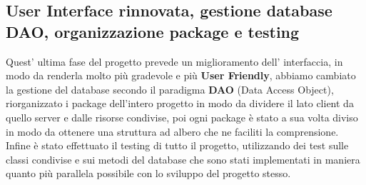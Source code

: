 \documentclass[a4paper,12pt]{article} %
\begin{document}
\subsection{User Interface rinnovata, gestione database DAO, organizzazione package e testing}
Quest' ultima fase del progetto prevede un miglioramento dell' interfaccia, in modo da renderla molto più gradevole e più \textbf{User Friendly}, abbiamo cambiato la gestione del database secondo il paradigma \textbf{DAO} (Data Access Object), riorganizzato i package dell'intero progetto in modo da dividere il lato client da quello server e dalle risorse condivise, poi ogni package è stato a sua volta diviso in modo da ottenere una struttura ad albero che ne faciliti la comprensione.\\
Infine è stato effettuato il testing di tutto il progetto, utilizzando dei test sulle classi condivise e sui metodi del database che sono stati implementati in maniera quanto più parallela possibile con lo sviluppo del progetto stesso.
\end{document}
